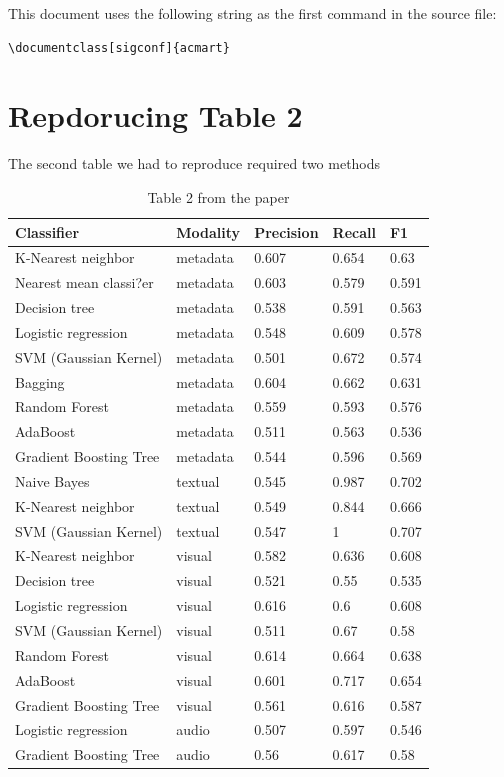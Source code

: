 \documentclass[sigconf]{acmart}
\begin{document}
This document uses the following string as the first command in the
source file:
\begin{verbatim}
\documentclass[sigconf]{acmart}
\end{verbatim}

\section{Repdorucing Table 2}
The second table we had to reproduce required two methods

\begin{table}[]
\caption*{Table 2 from the paper}
\begin{tabular}{lllll}
\hline
Classifier             & Modality & Precision & Recall & F1    \\ \hline
K-Nearest neighbor     & metadata & 0.607     & 0.654  & 0.63  \\
Nearest mean classi?er & metadata & 0.603     & 0.579  & 0.591 \\
Decision tree          & metadata & 0.538     & 0.591  & 0.563 \\
Logistic regression    & metadata & 0.548     & 0.609  & 0.578 \\
SVM (Gaussian Kernel)  & metadata & 0.501     & 0.672  & 0.574 \\
Bagging                & metadata & 0.604     & 0.662  & 0.631 \\
Random Forest          & metadata & 0.559     & 0.593  & 0.576 \\
AdaBoost               & metadata & 0.511     & 0.563  & 0.536 \\
Gradient Boosting Tree & metadata & 0.544     & 0.596  & 0.569 \\
Naive Bayes            & textual  & 0.545     & 0.987  & 0.702 \\
K-Nearest neighbor     & textual  & 0.549     & 0.844  & 0.666 \\
SVM (Gaussian Kernel)  & textual  & 0.547     & 1      & 0.707 \\
K-Nearest neighbor     & visual   & 0.582     & 0.636  & 0.608 \\
Decision tree          & visual   & 0.521     & 0.55   & 0.535 \\
Logistic regression    & visual   & 0.616     & 0.6    & 0.608 \\
SVM (Gaussian Kernel)  & visual   & 0.511     & 0.67   & 0.58  \\
Random Forest          & visual   & 0.614     & 0.664  & 0.638 \\
AdaBoost               & visual   & 0.601     & 0.717  & 0.654 \\
Gradient Boosting Tree & visual   & 0.561     & 0.616  & 0.587 \\
Logistic regression    & audio    & 0.507     & 0.597  & 0.546 \\
Gradient Boosting Tree & audio    & 0.56      & 0.617  & 0.58  \\ \hline
\end{tabular}
\end{table}
\end{document}
